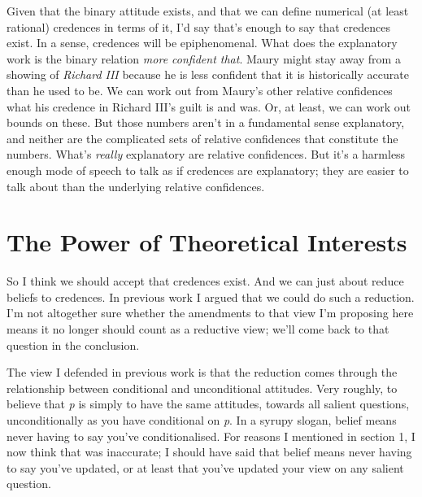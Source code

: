 Given that the binary attitude exists, and that we can define numerical (at least rational) credences in terms of it, I'd say that's enough to say that credences exist. In a sense, credences will be epiphenomenal. What does the explanatory work is the binary relation \textit{more confident that}. Maury might stay away from a showing of \textit{Richard III} because he is less confident that it is historically accurate than he used to be. We can work out from Maury's other relative confidences what his credence in Richard III's guilt is and was. Or, at least, we can work out bounds on these. But those numbers aren't in a fundamental sense explanatory, and neither are the complicated sets of relative confidences that constitute the numbers. What's \textit{really} explanatory are relative confidences. But it's a harmless enough mode of speech to talk as if credences are explanatory; they are easier to talk about than the underlying relative confidences.
%
%
\section{The Power of Theoretical Interests}
So I think we should accept that credences exist. And we can just about reduce beliefs to credences. In previous work I argued that we could do such a reduction. I'm not altogether sure whether the amendments to that view I'm proposing here means it no longer should count as a reductive view; we'll come back to that question in the conclusion.

The view I defended in previous work is that the reduction comes through the relationship between conditional and unconditional attitudes. Very roughly, to believe that \emph{p} is simply to have the same attitudes, towards all salient questions, unconditionally as you have conditional on \emph{p}. In a syrupy slogan, belief means never having to say you've conditionalised. For reasons I mentioned in section 1, I now think that was inaccurate; I should have said that belief means never having to say you've updated, or at least that you've updated your view on any salient question.

